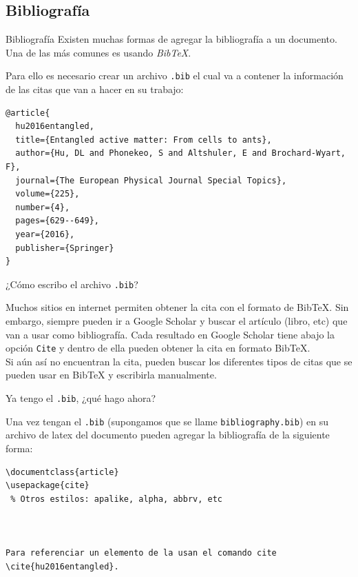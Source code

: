 \subsection{Bibliografía}
\begin{frame}[fragile]{Bibliografía}
Existen muchas formas de agregar la bibliografía a un documento. Una de las más
comunes es usando \emph{BibTeX}.\\[2mm]

\pause

Para ello es necesario crear un archivo \texttt{.bib} el cual va a contener la
información de las citas que van a hacer en su trabajo:

\begin{lstlisting}[basicstyle=\tiny]
@article{
  hu2016entangled,
  title={Entangled active matter: From cells to ants},
  author={Hu, DL and Phonekeo, S and Altshuler, E and Brochard-Wyart, F},
  journal={The European Physical Journal Special Topics},
  volume={225},
  number={4},
  pages={629--649},
  year={2016},
  publisher={Springer}
}
\end{lstlisting}

\end{frame}

\begin{frame}{¿Cómo escribo el archivo \texttt{.bib}?}

Muchos sitios en internet permiten obtener la cita con el formato de
BibTeX. Sin embargo, siempre pueden ir a Google Scholar y buscar el artículo
(libro, etc) que van a usar como bibliografía. Cada resultado en Google
Scholar tiene abajo la opción \texttt{Cite} y dentro de ella pueden obtener
la cita en formato BibTeX.\\[3mm]

Si aún así no encuentran la cita, pueden buscar los diferentes tipos de citas
que se pueden usar en BibTeX y escribirla manualmente.

\end{frame}

\begin{frame}[fragile]{Ya tengo el \texttt{.bib}, ¿qué hago ahora?}

Una vez tengan el \texttt{.bib} (supongamos que se llame
\texttt{bibliography.bib}) en su archivo de latex del documento pueden agregar
la bibliografía de la siguiente forma:

\begin{lstlisting}[basicstyle=\tiny]
\documentclass{article}
\usepackage{cite}
 % Otros estilos: apalike, alpha, abbrv, etc



Para referenciar un elemento de la usan el comando cite \cite{hu2016entangled}.



\end{lstlisting}

\end{frame}

